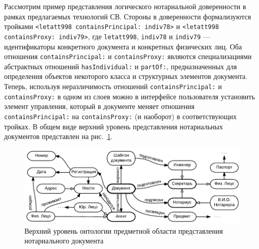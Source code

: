\documentclass[utf8]{../IncArticle}
\newcommand{\e}[2][fcolor]{\textcolor{pcolor}{[}\textcolor{#1}{#2}\textcolor{pcolor}{]}}
\begin{document}

Рассмотрим пример представления логического нотариальной доверенности
в рамках предлагаемых технологий СВ.  Стороны в доверенности
формализуются тройками \texttt{<letatt998 containsPrincipal: indiv78>}
и \texttt{<letatt998 containsProxy: indiv79>}, где \texttt{letatt998},
\texttt{indiv78} и \texttt{indiv79} --- идентификаторы конкретного
документа и конкретных физических лиц.  Оба отношения
\texttt{containsPrincipal:} и \texttt{containsProxy:} являются
специализациями абстрактных отношений \texttt{hasIndividual:} и
\texttt{partOf:}, предназначенных для определения объектов некоторого
класса и структурных элементов документа.  Теперь, используя
неразличимость отношений \texttt{containsPrincipal:} и
\texttt{containsProxy:} в одном из слоев можно в интерфейсе
пользователя установить элемент управления, который в документе меняет
отношения \texttt{containsPrincipal:} на \texttt{containsProxy:} (и
наоборот) в соответствующих тройках.  В общем виде верхний уровень представления
нотариальных документов представлен на рис.~\ref{notaryontology}.
\begin{figure}[!t]
\centering
\includegraphics[width=0.8\linewidth]{DocumentOntology-ru.pdf}
\caption{Верхний уровень онтологии предметной области представления
  нотариального документа}
\label{notaryontology}
\end{figure}
\end{document}
